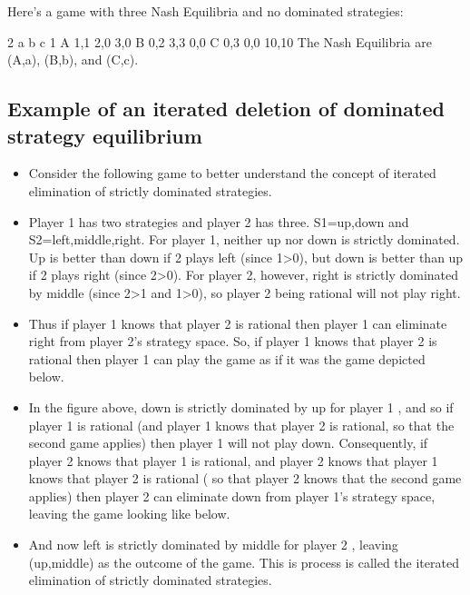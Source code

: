 \documentclass[a4paper,12pt]{article}
\begin{document}
Here's a game with three Nash Equilibria and no dominated strategies:

2
a	b	c
1	A	1,1	2,0	3,0
B	0,2	3,3	0,0
C	0,3	0,0	10,10
The Nash Equilibria are (A,a), (B,b), and (C,c).


\subsection{Example of an iterated deletion of dominated strategy equilibrium}
\begin{itemize}
\item Consider the following game to better understand the concept of iterated elimination of strictly dominated strategies.
\item Player 1 has two strategies and player 2 has three. S1={up,down} and S2={left,middle,right}. For player 1, neither up nor down is strictly dominated. Up is better than down if 2 plays left (since 1>0), but down is better than up if 2 plays right (since 2>0). For player 2, however, right is strictly dominated by middle (since 2>1 and 1>0), so player 2 being rational will not play right.

\item Thus if player 1 knows that player 2 is rational then player 1 can eliminate right from player 2's strategy space. So, if player 1 knows that player 2 is rational then player 1 can play the game as if it was the game depicted below.

\item In the figure above, down is strictly dominated by up for player 1 , and so if player 1 is rational (and player 1 knows that player 2 is rational, so that the second game applies) then player 1 will not play down. Consequently, if player 2 knows that player 1 is rational, and player 2 knows that player 1 knows that player 2 is rational ( so that player 2 knows that the second game applies) then player 2 can eliminate down from player 1's strategy space, leaving the game looking like below.

\item 
And now left is strictly dominated by middle for player 2 , leaving (up,middle) as the outcome of the game. This is process is called the iterated elimination of strictly dominated strategies.
\end{itemize}
\end{document}
